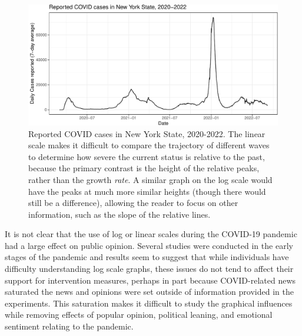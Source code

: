 \documentclass[article]{jdssv}\usepackage[]{graphicx}\usepackage[]{color}
\newenvironment{knitrout}{}{} %
\begin{document}
\begin{knitrout}\footnotesize
{}\color{fgcolor}\begin{figure}

{\centering \includegraphics[width=.8\linewidth]{Figures_R/fig-linear-scales-ref-lines-1} 

}

\caption[Reported COVID cases in New York State, 2020-2022]{Reported COVID cases in New York State, 2020-2022. The linear scale makes it difficult to compare the trajectory of different waves to determine how severe the current status is relative to the past, because the primary contrast is the height of the relative peaks, rather than the growth \emph{rate}. A similar graph on the log scale would have the peaks at much more similar heights (though there would still be a difference), allowing the reader to focus on other information, such as the slope of the relative lines.}\label{fig:linear-scales-ref-lines}
\end{figure}

\end{knitrout}



It is not clear that the use of log or linear scales during the COVID-19 pandemic had a large effect on public opinion. Several studies were conducted in the early stages of the pandemic \citep{romanoScaleCOVID19Graphs2020, seviLogarithmicLinearVisualizations2020, ryanGraphsLogarithmicAxes2020} and results seem to suggest that while individuals have difficulty understanding log scale graphs, these issues do not tend to affect their support for intervention measures, perhaps in part because COVID-related news saturated the news and opinions were set outside of information provided in the experiments. This saturation makes it difficult to study the graphical influences while removing effects of popular opinion, political leaning, and emotional sentiment relating to the pandemic. 
\end{document}
